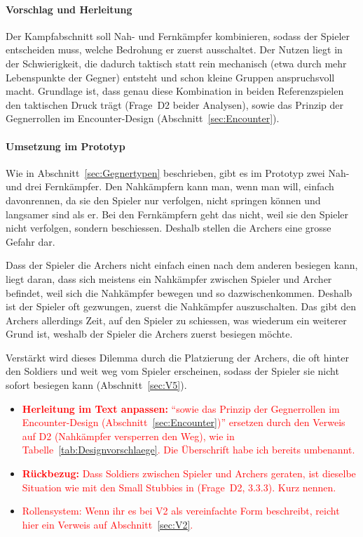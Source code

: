 \documentclass[../Main.tex]{subfiles}
\begin{document}
\paragraph{Vorschlag und Herleitung}
Der Kampfabschnitt soll Nah- und Fernkämpfer kombinieren, sodass der Spieler entscheiden muss, welche Bedrohung er zuerst ausschaltet. Der Nutzen liegt in der Schwierigkeit, die dadurch taktisch statt rein mechanisch (etwa durch mehr Lebenspunkte der Gegner) entsteht und schon kleine Gruppen anspruchsvoll macht. Grundlage ist, dass genau diese Kombination in beiden Referenzspielen den taktischen Druck trägt (Frage~D2 beider Analysen), sowie das Prinzip der Gegnerrollen im Encounter-Design (Abschnitt~\ref{sec:Encounter}).

\paragraph{Umsetzung im Prototyp}
Wie in Abschnitt~\ref{sec:Gegnertypen} beschrieben, gibt es im Prototyp zwei Nah- und drei Fernkämpfer. Den Nahkämpfern kann man, wenn man will, einfach davonrennen, da sie den Spieler nur verfolgen, nicht springen können und langsamer sind als er. Bei den Fernkämpfern geht das nicht, weil sie den Spieler nicht verfolgen, sondern beschiessen. Deshalb stellen die Archers eine grosse Gefahr dar.

Dass der Spieler die Archers nicht einfach einen nach dem anderen besiegen kann, liegt daran, dass sich meistens ein Nahkämpfer zwischen Spieler und Archer befindet, weil sich die Nahkämpfer bewegen und so dazwischenkommen. Deshalb ist der Spieler oft gezwungen, zuerst die Nahkämpfer auszuschalten. Das gibt den Archers allerdings Zeit, auf den Spieler zu schiessen, was wiederum ein weiterer Grund ist, weshalb der Spieler die Archers zuerst besiegen möchte.

Verstärkt wird dieses Dilemma durch die Platzierung der Archers, die oft hinter den Soldiers und weit weg vom Spieler erscheinen, sodass der Spieler sie nicht sofort besiegen kann (Abschnitt~\ref{sec:V5}).

\begin{itemize}[leftmargin=1.5cm]
    \item \textcolor{red}{\textbf{Herleitung im Text anpassen:} \enquote{sowie das Prinzip der Gegnerrollen im Encounter-Design (Abschnitt~\ref{sec:Encounter})} ersetzen durch den Verweis auf  D2 (Nahkämpfer versperren den Weg), wie in Tabelle~\ref{tab:Designvorschlaege}. Die Überschrift habe ich bereits umbenannt.}
    \item \textcolor{red}{\textbf{Rückbezug:} Dass Soldiers zwischen Spieler und Archers geraten, ist dieselbe Situation wie mit den Small Stubbies in  (Frage~D2, 3.3.3). Kurz nennen.}
    \item \textcolor{red}{Rollensystem: Wenn ihr es bei V2 als vereinfachte Form beschreibt, reicht hier ein Verweis auf Abschnitt~\ref{sec:V2}.}
\end{itemize}
\end{document}
